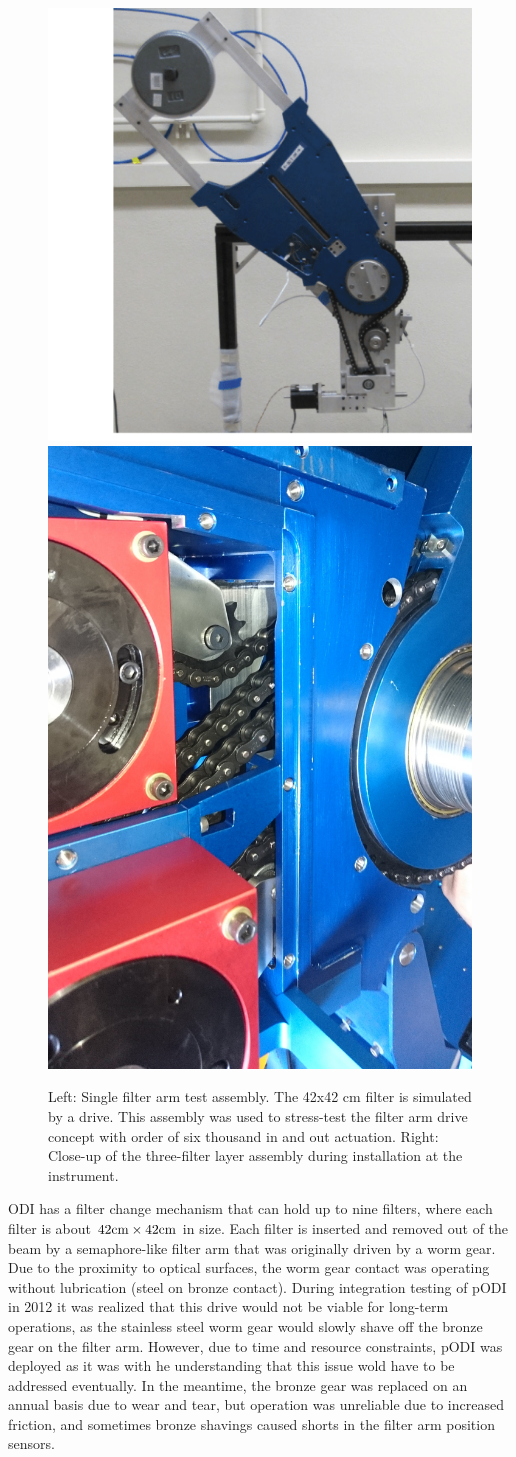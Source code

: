 \documentclass[]{spieman}
\begin{document}
\begin{figure}
	
	\hfill
	\includegraphics[height=0.49\textwidth]{images/filterdrivetest.png}	\hfill
	\includegraphics[height=0.49\textwidth]{images/DSC_0309.JPG} \hfill \hfill
    
	\caption{\label{fig_filterdrive} Left: Single filter arm test assembly. The
    42x42 cm filter is simulated by a drive. This assembly was used to stress-test
    the filter arm drive concept with order of six thousand in and out actuation.
    Right: Close-up of the three-filter layer assembly during installation at the
    instrument.} 

\end{figure}

ODI has a filter change mechanism that can hold up to nine filters, where each
filter is about $42 \rm{cm} \times 42 \rm{cm}$ in size. Each filter is inserted
and removed out of the beam by a semaphore-like filter arm that was originally
driven by a worm gear\cite{Muller2008}. Due to the proximity to optical
surfaces, the worm gear contact was operating without lubrication (steel on
bronze contact). During integration testing of pODI in 2012 it was realized that
this drive would not be viable for long-term operations, as the stainless steel
worm gear would slowly shave off the bronze gear on the filter arm. However, due
to time and resource constraints, pODI was deployed as it was with he understanding that
this issue wold have to be addressed eventually. In the meantime, the bronze
gear was replaced on an annual basis due to wear and tear, but operation was
unreliable due to increased friction, and sometimes bronze shavings caused
shorts in the filter arm position sensors.
\end{document}
